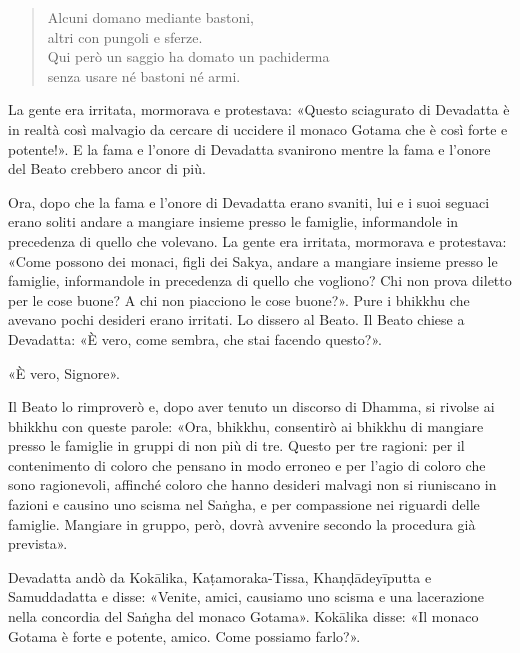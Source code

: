 \begin{quote}
Alcuni domano mediante bastoni, \\
altri con pungoli e sferze. \\
Qui però un saggio ha domato un pachiderma \\
senza usare né bastoni né armi.
\end{quote}

La gente era irritata, mormorava e protestava: «Questo sciagurato di Devadatta è
in realtà così malvagio da cercare di uccidere il monaco Gotama che è così forte
e potente!». E la fama e l’onore di Devadatta svanirono mentre la fama e l’onore
del Beato crebbero ancor di più.


Ora, dopo che la fama e l’onore di Devadatta erano svaniti, lui e i suoi seguaci
erano soliti andare a mangiare insieme presso le famiglie, informandole in
precedenza di quello che volevano. La gente era irritata, mormorava e
protestava: «Come possono dei monaci, figli dei Sakya, andare a mangiare insieme
presso le famiglie, informandole in precedenza di quello che vogliono? Chi non
prova diletto per le cose buone? A chi non piacciono le cose buone?». Pure i
bhikkhu che avevano pochi desideri erano irritati. Lo dissero al Beato. Il Beato
chiese a Devadatta: «È vero, come sembra, che stai facendo questo?».

«È vero, Signore».

Il Beato lo rimproverò e, dopo aver tenuto un discorso di Dhamma, si rivolse ai
bhikkhu con queste parole: «Ora, bhikkhu, consentirò ai bhikkhu di mangiare
presso le famiglie in gruppi di non più di tre. Questo per tre ragioni: per il
contenimento di coloro che pensano in modo erroneo e per l’agio di coloro che
sono ragionevoli, affinché coloro che hanno desideri malvagi non si riuniscano
in fazioni e causino uno scisma nel Saṅgha, e per compassione nei riguardi delle
famiglie. Mangiare in gruppo, però, dovrà avvenire secondo la procedura già
prevista».


Devadatta andò da Kokālika, Kaṭamoraka-Tissa, Khaṇḍādeyīputta e Samuddadatta e
disse: «Venite, amici, causiamo uno scisma e una lacerazione nella concordia del
Saṅgha del monaco Gotama». Kokālika disse: «Il monaco Gotama è forte e potente,
amico. Come possiamo farlo?».

